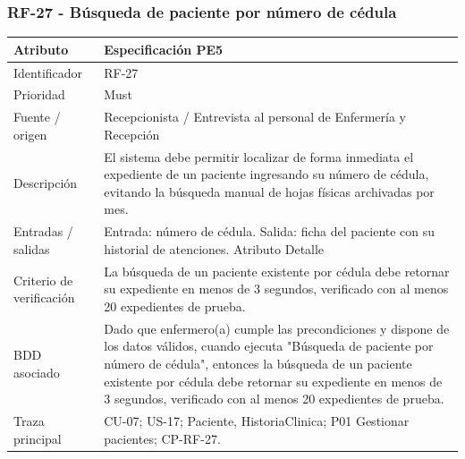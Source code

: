 \documentclass[11pt,a4paper]{article}
\begin{document}
	\subsubsection{RF-27 - Búsqueda de paciente por número de cédula}
	\begin{tabularx}{\textwidth}{p{3.2cm}Y}
		\toprule
		\textbf{Atributo} & \textbf{Especificación PE5}\\\midrule
		Identificador & RF-27\\
		Prioridad & Must\\
		Fuente / origen & Recepcionista / Entrevista al personal de Enfermería y Recepción\\
		Descripción & El sistema debe permitir localizar de forma inmediata el expediente de un paciente ingresando su número de cédula, evitando la búsqueda manual de hojas físicas archivadas por mes.\\
		Entradas / salidas & Entrada: número de cédula. Salida: ficha del paciente con su historial de atenciones. Atributo Detalle\\
		Criterio de verificación & La búsqueda de un paciente existente por cédula debe retornar su expediente en menos de 3 segundos, verificado con al menos 20 expedientes de prueba.\\
		BDD asociado & Dado que enfermero(a) cumple las precondiciones y dispone de los datos válidos, cuando ejecuta "Búsqueda de paciente por número de cédula", entonces la búsqueda de un paciente existente por cédula debe retornar su expediente en menos de 3 segundos, verificado con al menos 20 expedientes de prueba.\\
		Traza principal & CU-07; US-17; Paciente, HistoriaClinica; P01 Gestionar pacientes; CP-RF-27.\\
		\bottomrule
	\end{tabularx}
\end{document}
